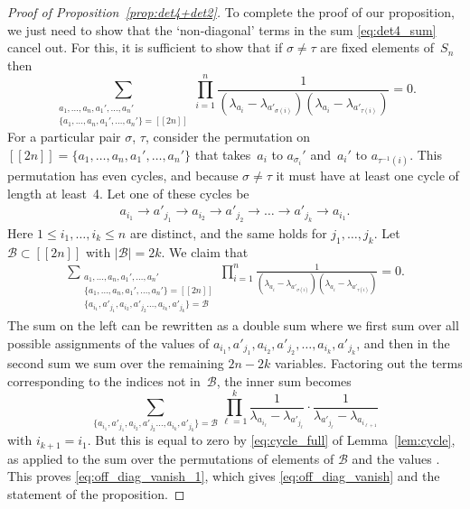 \documentclass[pdftex]{sigma}
\numberwithin{equation}{section}
\theoremstyle{definition}
\newcommand{\cB}{\mathcal{B}}
\newcommand{\lst}[1]{[\![#1 ]\!]}
\begin{document}
\begin{proof}[Proof of Proposition~\ref{prop:det4+det2}]
To complete the proof of our proposition, we just need to show that the `non-diagonal' terms in the sum \eqref{eq:det4_sum} cancel out. For this, it is sufficient to show that if $\sigma\neq \tau$ are fixed elements of~$S_n$ then
\begin{equation}
\label{eq:off_diag_vanish}
\sum_{\substack{a_1,\dots, a_n, a_1', \dots, a_n'\\\{a_1,\dots, a_n, a_1', \dots, a_n'\}=\lst{2n}}}
 \prod_{i=1}^n \frac{1}{(\lambda_{a_i} - \lambda_{a'_{\sigma(i)}})(\lambda_{a_i} - \lambda_{a'_{\tau(i)}})}=0.
\end{equation}
For a particular pair $\sigma$, $\tau$, consider the permutation on $\lst{2n}=\{a_1,\dots, a_n, a_1', \dots, a_n'\}$ that takes~$a_i$ to $a_{\sigma_i}'$ and~$a_i'$ to $a_{\tau^{-1}(i)}$. This permutation has even cycles, and because $\sigma\neq \tau$ it must have at least one cycle of length at least~4. Let one of these cycles be
\begin{align*}%
 a_{i_1}\to a'_{j_1} \to a_{i_2} \to a'_{j_2} \to \dots\to a'_{j_k}\to a_{i_1}.
\end{align*}
Here $1\le i_1,\dots,i_k\le n$ are distinct, and the same holds for $j_1, \dots, j_k$. Let $\cB\subset \lst{2n}$ with ${|\cB|=2k}$. We claim that
\begin{align}\label{eq:off_diag_vanish_1}
\sum_{\substack{a_1,\dots, a_n, a_1', \dots, a_n'\\\{a_1,\dots, a_n, a_1', \dots, a_n'\}=\lst{2n}\\ \{a_{i_1},a'_{j_1}, a_{i_2}, a'_{j_2} \dots, a_{i_k}, a'_{j_k}\}=\cB }}
 \prod_{i=1}^n \frac{1}{(\lambda_{a_i} - \lambda_{a'_{\sigma(i)}})(\lambda_{a_i} - \lambda_{a'_{\tau(i)}})}=0.
\end{align}
The sum on the left can be rewritten as a double sum where we first sum over all possible assignments of the values of $a_{i_1},a'_{j_1}, a_{i_2}, a'_{j_2}, \dots, a_{i_k}, a'_{j_k}$, and then in the second sum we sum over the remaining $2n-2k$ variables. Factoring out the terms corresponding to the indices not in~$\cB$, the inner sum becomes
\[
\sum_{\{a_{i_1},a'_{j_1}, a_{i_2}, a'_{j_2} \dots, a_{i_k}, a'_{j_k}\}=\cB} \prod_{\ell=1}^k \frac{1}{\lambda_{a_{i_\ell}}-\lambda_{a'_{j_\ell}}}\cdot \frac{1}{\lambda_{a'_{j_\ell}}-\lambda_{a_{i_{\ell+1}}}}
\]
with $i_{k+1}=i_1$. But this is equal to zero by \eqref{eq:cycle_full} of Lemma~\ref{lem:cycle}, as applied to the sum over the permutations of elements of $\cB$ and the values . This proves \eqref{eq:off_diag_vanish_1}, which gives \eqref{eq:off_diag_vanish} and the statement of the proposition.
\end{proof}
\end{document}
